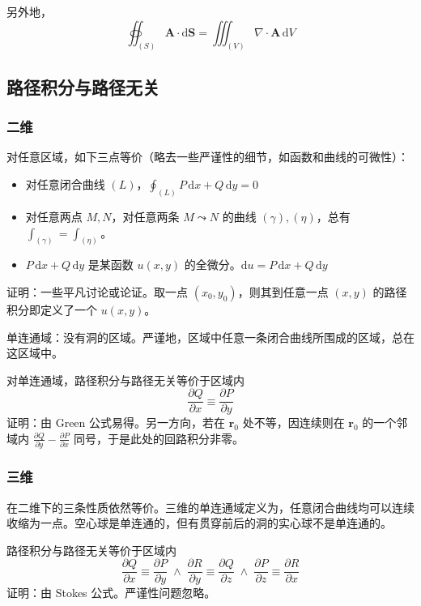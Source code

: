 \documentclass[12pt, a4paper, UTF8, openany]{ctexbook}
\newcommand{\dif}{\mathrm{d}}
\newcommand{\sdif}{\,\dif}
\newcommand{\mat}[1]{\mathbf{#1}}
\begin{document}
        另外地，$$\oiint_{(S)} \mat{A} \cdot \mat{\dif S} = \iiint_{(V)} \nabla \cdot \mat{A} \sdif V$$

        \subsection{路径积分与路径无关}
        \subsubsection{二维}
        对任意区域，如下三点等价（略去一些严谨性的细节，如函数和曲线的可微性）：
        \begin{itemize}
            \item 对任意闭合曲线 $(L)$，$\oint_{(L)} P\sdif x + Q\sdif y = 0$
            \item 对任意两点 $M, N$，对任意两条 $M \leadsto N$ 的曲线 $(\gamma), (\eta)$，总有 $\int_{(\gamma)} = \int_{(\eta)}$。
            \item $P\sdif x + Q\sdif y$ 是某函数 $u(x, y)$ 的全微分。$\dif u = P\sdif x + Q\sdif y$
        \end{itemize}
        证明：一些平凡讨论或论证。取一点 $(x_0, y_0)$，则其到任意一点 $(x, y)$ 的路径积分即定义了一个 $u(x, y)$。

        单连通域：没有洞的区域。严谨地，区域中任意一条闭合曲线所围成的区域，总在这区域中。

        对{\heiti 单连通域}，路径积分与路径无关等价于区域内
        $$\boxed{\frac{\partial Q}{\partial x} \equiv \frac{\partial P}{\partial y}}$$
        证明：由 Green 公式易得。另一方向，若在 $\mat{r}_0$ 处不等，因连续则在 $\mat{r}_0$ 的一个邻域内 $\frac{\partial Q}{\partial y} - \frac{\partial P}{\partial x}$ 同号，于是此处的回路积分非零。

        \subsubsection{三维}
        在二维下的三条性质依然等价。三维的单连通域定义为，任意闭合曲线均可以连续收缩为一点。空心球是单连通的，但有贯穿前后的洞的实心球不是单连通的。

        路径积分与路径无关等价于区域内
        $$\boxed{\frac{\partial Q}{\partial x} \equiv \frac{\partial P}{\partial y} \;\land\;
            \frac{\partial R}{\partial y} \equiv \frac{\partial Q}{\partial z} \;\land\; 
            \frac{\partial P}{\partial z} \equiv \frac{\partial R}{\partial x}}$$
        证明：由 Stokes 公式。严谨性问题忽略。
\end{document}

